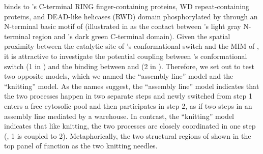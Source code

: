  binds to 's C-terminal RING finger-containing proteins, WD repeat-containing proteins, and DEAD-like helicases (RWD) domain phosphorylated by  through an N-terminal basic motif of  \cite{Ji2017eLife, BUB1-CDC20-MAD1} (illustrated in  as the contact between 's light gray N-terminal region and 's dark green C-terminal domain). Given the spatial proximity between the catalytic site of 's conformational switch and the MIM of , it is attractive to investigate the potential coupling between 's conformational switch (\textcircled{\small{1}} in ) and the binding between  and  (\textcircled{\small{2}} in ). Therefore, we set out to test two opposite models, which we named the ``assembly line'' model and the ``knitting'' model. As the names suggest, the ``assembly line'' model indicates that the two processes happen in two separate steps and newly switched  from step \textcircled{\small{1}} enters a free cytosolic pool and then participates in step \textcircled{\small{2}}, as if two steps in an assembly line mediated by a warehouse. In contrast, the ``knitting'' model indicates that like knitting, the two processes are closely coordinated in one step  (, \textcircled{\small{1}} is coupled to \textcircled{\small{2}}). Metaphorically, the two structural regions of  shown in the top panel of  function as the two knitting needles.

